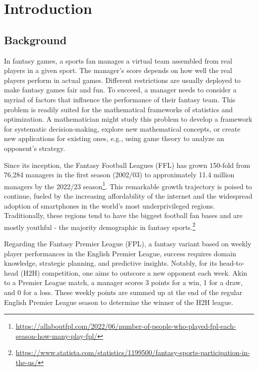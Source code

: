 \documentclass[12pt,oneside,a4paper]{book}
\theoremstyle{definition}
\theoremstyle{remark}
\begin{document}
	\newpage
	\tableofcontents

	\mainmatter
	\chapter{Introduction}
		\section{Background}
			In fantasy games, a sports fan manages a virtual team assembled from real players in a given sport. The manager’s score depends on how well the real players perform in actual games. Different restrictions are usually deployed to make fantasy games fair and fun. To succeed, a manager needs to consider a myriad of factors that influence the performance of their fantasy team. This problem is readily suited for the mathematical frameworks of statistics and optimization. A mathematician might study this problem to develop a framework for systematic decision-making, explore new mathematical concepts, or create new applications for existing ones, e.g., using game theory to analyze an opponent’s strategy.

			Since its inception, the Fantasy Football Leagues (FFL) has grown 150-fold from 76,284 managers in the first season (2002/03) to approximately 11.4 million managers by the 2022/23 season\footnote{\url{https://allaboutfpl.com/2022/06/number-of-people-who-played-fpl-each-season-how-many-play-fpl/}}. This remarkable growth trajectory is poised to continue, fueled by the increasing affordability of the internet and the widespread adoption of smartphones in the world’s most underprivileged regions. Traditionally, these regions tend to have the biggest football fan bases and are mostly youthful - the majority demographic in fantasy sports.\footnote{\url{https://www.statista.com/statistics/1199500/fantasy-sports-participation-in-the-us/}}

			Regarding the Fantasy Premier League (FPL), a fantasy variant based on weekly player performances in the English Premier League, success requires domain knowledge, strategic planning, and predictive insights. Notably, for its head-to-head (H2H) competition, one aims to outscore a new opponent each week. Akin to a Premier League match, a manager scores 3 points for a win, 1 for a draw, and 0 for a loss. These weekly points are summed up at the end of the regular English Premier League season to determine the winner of the H2H league.
\end{document}
